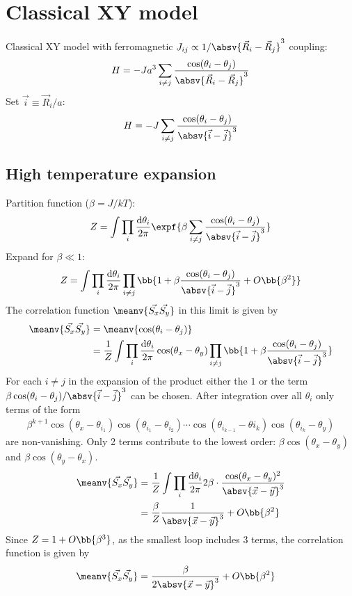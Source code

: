 
\newcommand{\Raij}{\absv{\vec{R}_i-\vec{R}_j}^3}
\newcommand{\aij}{\absv{\vec{i}-\vec{j}}^3}
\newcommand{\suminj}{\sum_{i\ne j}}

\chapter{Classical XY model}

Classical XY model with ferromagnetic $J_{ij} \propto 1/\Raij$ coupling:
\begin{align*}
H=-J a^3 \sum_{i\ne j} \frac{\cos(\theta_i - \theta_j)}{\Raij}
\end{align*}
Set $\vec{i}\equiv \vec{R}_i/a$:
\begin{align*}
H=-J \sum_{i\ne j} \frac{\cos(\theta_i - \theta_j)}{\aij}
\end{align*}

\section{High temperature expansion}
Partition function ($\beta = J/kT$):
\begin{align*}
Z=\int\prod_{i} \frac{\text{d}\theta_i}{2\pi}  \expf{\beta \suminj \frac{\cos(\theta_i - \theta_j)}{\aij}}
\end{align*}
Expand for $\beta \ll 1$:
\begin{align*}
Z=\int\prod_{i} \frac{\text{d}\theta_i}{2\pi}  \prod_{i\ne j}  \bb{1 + \beta \frac{\cos(\theta_i - \theta_j)}{\aij} + O\bb{\beta^2}}
\end{align*}
The correlation function $\meanv{\vec{S_x} \vec{S_y}}$ in this limit is given by
\begin{align*}
\meanv{\vec{S_x} \vec{S_y}} &= \meanv{\cos(\theta_i - \theta_j)} \\ &= \frac{1}{Z} \int\prod_{i} \frac{\text{d}\theta_i}{2\pi}  \cos(\theta_x - \theta_y)
\prod_{i\ne j}  \bb{1 + \beta \frac{\cos(\theta_i - \theta_j)}{\aij}}
\end{align*}
For each $i\ne j$ in the expansion of the product either the $1$ or the term $\beta \cos(\theta_i - \theta_j)/\aij$ can be chosen. After integration over all $\theta_i$ only terms of the form
\begin{align*}
\beta^{k+1} \cos(\theta_x - \theta_{i_1}) \cos(\theta_{i_1} - \theta_{i_2}) \cdots \cos(\theta_{i_{k-1}}-\theta{i_k})\cos(\theta_{i_k} - \theta_y)
\end{align*}
are non-vanishing. Only 2 terms contribute to the lowest order: $\beta \cos(\theta_x - \theta_y)$ and $\beta \cos(\theta_y - \theta_x)$.
\begin{align*}
\meanv{\vec{S_x} \vec{S_y}} &= \frac{1}{Z} \int\prod_{i} \frac{\text{d}\theta_i}{2\pi} 2 \beta \cdot \frac{\cos(\theta_x - \theta_y)^2}{\absv{\vec{x}-\vec{y}}^3} \\
&= \frac{\beta}{Z} \frac{1}{\absv{\vec{x}-\vec{y}}^3} + O\bb{\beta^2}
\end{align*}
Since $Z = 1+O\bb{\beta^3}$, as the smallest loop includes 3 terms, the correlation function is given by
\begin{align*}
\meanv{\vec{S_x} \vec{S_y}} &= \frac{\beta}{2\absv{\vec{x}-\vec{y}}^3} + O\bb{\beta^2}
\end{align*}

